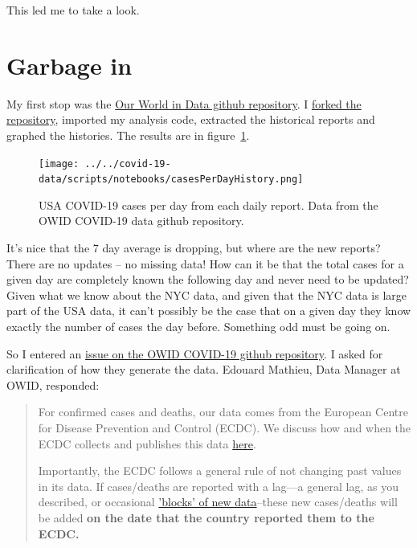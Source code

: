 \documentclass[10pt,reqno]{amsart}
\begin{document}
This led me to take a look.

\section{Garbage in}
My first stop was the
\href{https://github.com/owid/covid-19-data}{Our World in Data github
  repository}\nocite{owid2020data}.  I
\href{https://github.com/hjstein/covid-19-data}{forked the
  repository}, imported my analysis code, extracted the historical
reports and graphed the histories.  The results are in figure~\ref{fig:owid}.

\begin{figure}[H]
  \centering
  \texttt{[image: ../../covid-19-data/scripts/notebooks/casesPerDayHistory.png]}
  \caption{USA COVID-19 cases per day from each daily report.  Data
    from the OWID COVID-19 data github repository.}
  \label{fig:owid}
\end{figure}

It's nice that the 7 day average is dropping, but where are the new
reports?  There are no updates -- no missing data!  How can it be
that the total cases for a given day are completely known the
following day and never need to be updated?
Given what we know about the NYC data, and given
that the NYC data is large part of the USA data, it can't possibly be
the case that on a given day they know exactly the number of cases the
day before.  Something odd must be going on.

So I entered an
\href{https://github.com/owid/covid-19-data/issues/41}{issue on the
  OWID COVID-19 github repository}.  I asked for clarification of how they generate the
data.  Edouard Mathieu, Data Manager at OWID, responded:
\begin{quotation}
  For confirmed cases and deaths, our data comes from the European
  Centre for Disease Prevention and Control (ECDC). We discuss how and
  when the ECDC collects and publishes this data \href{https://ourworldindata.org/coronavirus#our-world-in-data-relies-on-data-from-the-european-cdc}{here}.

  Importantly, the ECDC follows a general rule of not changing past
  values in its data. If cases/deaths are reported with a lag—a general
  lag, as you described, or occasional
  \href{https://www.theguardian.com/us-news/2020/apr/15/new-york-city-coronavirus-death-toll-jumps-revised-count}{'blocks'
    of new data}--these new
  cases/deaths will be added \bf{on the date that the country reported them
    to the ECDC.}
\end{quotation}
\end{document}
